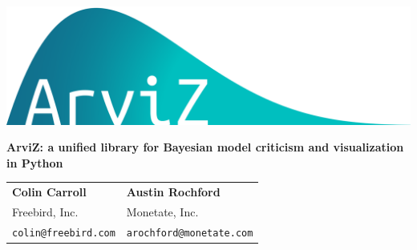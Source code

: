 \documentclass[a0,portrait]{a0poster}
\begin{document}


%
\begin{minipage}[b]{0.25\linewidth}
\includegraphics[width=45cm]{logo.png}
\end{minipage}
%
\begin{minipage}[b]{0.75\linewidth}
\begin{flushright}
\VeryHuge \color{NavyBlue} \textbf{ArviZ: a unified library for Bayesian model criticism and visualization in Python} \color{Black} %
\end{flushright}
\end{minipage}
\begin{flushright}
\begin{tabular}{l l}
\huge \textbf{Colin Carroll} & \huge \textbf{Austin Rochford} \\
\huge Freebird, Inc. & \huge Monetate, Inc. \\
\Large \texttt{colin@freebird.com} & \Large \texttt{arochford@monetate.com}
\end{tabular}
\end{flushright}


\vspace{1cm} %

\end{document}
